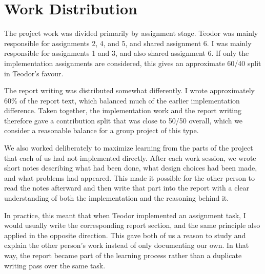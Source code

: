 \section{Work Distribution}

The project work was divided primarily by assignment stage. Teodor was mainly responsible for assignments 2, 4, and 5, and shared assignment 6. I was mainly responsible for assignments 1 and 3, and also shared assignment 6. If only the implementation assignments are considered, this gives an approximate 60/40 split in Teodor's favour.

The report writing was distributed somewhat differently. I wrote approximately 60\% of the report text, which balanced much of the earlier implementation difference. Taken together, the implementation work and the report writing therefore gave a contribution split that was close to 50/50 overall, which we consider a reasonable balance for a group project of this type.

We also worked deliberately to maximize learning from the parts of the project that each of us had not implemented directly. After each work session, we wrote short notes describing what had been done, what design choices had been made, and what problems had appeared. This made it possible for the other person to read the notes afterward and then write that part into the report with a clear understanding of both the implementation and the reasoning behind it.

In practice, this meant that when Teodor implemented an assignment task, I would usually write the corresponding report section, and the same principle also applied in the opposite direction. This gave both of us a reason to study and explain the other person's work instead of only documenting our own. In that way, the report became part of the learning process rather than a duplicate writing pass over the same task.
